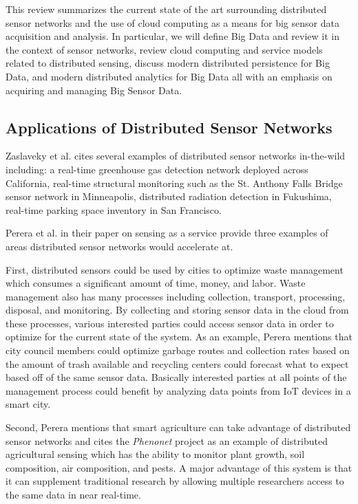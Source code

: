 \documentclass[]{article}
\begin{document}
This review summarizes the current state of the art surrounding distributed sensor networks and the use of cloud computing as a means for big sensor data acquisition and analysis. In particular, we will define Big Data and review it in the context of sensor networks, review cloud computing and service models related to distributed sensing, discuss modern distributed persistence for Big Data, and modern distributed analytics for Big Data all with an emphasis on acquiring and managing Big Sensor Data.

\subsection{Applications of Distributed Sensor Networks} \label{ssec:applications-of-distributed-sensor-networks}
Zaslaveky et al. \cite{zaslavsky_sensing_2013} cites several examples of distributed sensor networks in-the-wild including: a real-time greenhouse gas detection network deployed across California, real-time structural monitoring such as the St. Anthony Falls Bridge sensor network in Minneapolis, distributed radiation detection in Fukushima, real-time parking space inventory in San Francisco.

Perera et al. in their paper on sensing as a service\cite{perera_sensing_2014} provide three examples of areas distributed sensor networks would accelerate at. 

First, distributed sensors could be used by cities to optimize waste management which consumes a significant amount of time, money, and labor. Waste management also has many processes including collection, transport, processing, disposal, and monitoring. By collecting and storing sensor data in the cloud from these processes, various interested parties could access sensor data in order to optimize for the current state of the system. As an example, Perera mentions that city council members could optimize garbage routes and collection rates based on the amount of trash available and recycling centers could forecast what to expect based off of the same sensor data. Basically interested parties at all points of the management process could benefit by analyzing data points from IoT devices in a smart city.

Second, Perera mentions that smart agriculture can take advantage of distributed sensor networks and cites the  \textit{Phenonet} project as an example of distributed agricultural sensing which has the ability to monitor plant growth, soil composition, air composition, and pests. A major advantage of this system is that it can supplement traditional research by allowing multiple researchers access to the same data in near real-time.
\end{document}
